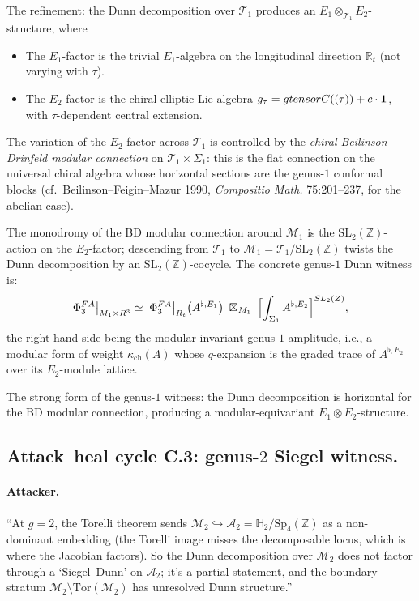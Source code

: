 \documentclass[11pt]{article}
\newcommand{\Eone}{E_{1}}
\newcommand{\Etwo}{E_{2}}
\newcommand{\PhiFA}{\Phi^{\mathrm{FA}}}
\newcommand{\R}{\mathbb{R}}
\newcommand{\C}{\mathbb{C}}
\newcommand{\Z}{\mathbb{Z}}
\newcommand{\cA}{\mathcal{A}}
\newcommand{\cM}{\mathcal{M}}
\newcommand{\cT}{\mathcal{T}}
\newcommand{\frakg}{\mathfrak{g}}
\newcommand{\into}{\hookrightarrow}
\begin{document}
The refinement: the Dunn decomposition over $\cT_1$ produces an
$\Eone \otimes_{\cT_1} \Etwo$-structure, where
\begin{itemize}
\item The $\Eone$-factor is the trivial $\Eone$-algebra on the
  longitudinal direction $\R_t$ (not varying with $\tau$).
\item The $\Etwo$-factor is the chiral elliptic Lie algebra
  $\hat\frakg_\tau = \frakg \otimes \C((\tau)) + c\cdot \mathbf 1$, with
  $\tau$-dependent central extension.
\end{itemize}
The variation of the $\Etwo$-factor across $\cT_1$ is controlled by
the \emph{chiral Beilinson--Drinfeld modular connection} on
$\cT_1 \times \Sigma_1$: this is the flat connection on the
universal chiral algebra whose horizontal sections are the genus-$1$
conformal blocks (cf.\ Beilinson--Feigin--Mazur 1990, \emph{Compositio
Math.} 75:201--237, for the abelian case).

The monodromy of the BD modular connection around $\cM_1$ is the
$\mathrm{SL}_2(\Z)$-action on the $\Etwo$-factor; descending from
$\cT_1$ to $\cM_1 = \cT_1 / \mathrm{SL}_2(\Z)$ twists the Dunn
decomposition by an $\mathrm{SL}_2(\Z)$-cocycle. The concrete genus-$1$
Dunn witness is:
\[
  \PhiFA_3\bigl|_{\overline{\cM}_1 \times \R^3}
  \;\simeq\;
  \PhiFA_3\bigl|_{\R_t}\bigl(A^{\flat, \Eone}\bigr)
  \;\boxtimes_{\overline{\cM}_1}\;
  \Bigl[\int_{\Sigma_1} A^{\flat, \Etwo}\Bigr]^{\mathrm{SL}_2(\Z)},
\]
the right-hand side being the modular-invariant genus-$1$ amplitude,
i.e., a modular form of weight $\kappa_{\mathrm{ch}}(A)$ whose
$q$-expansion is the graded trace of $A^{\flat, \Etwo}$ over its
$\Etwo$-module lattice.

The strong form of the genus-$1$ witness: the Dunn decomposition is
horizontal for the BD modular connection, producing a
modular-equivariant $\Eone \otimes \Etwo$-structure.

\subsection{Attack--heal cycle C.3: genus-$2$ Siegel witness.}

\paragraph{Attacker.}
``At $g = 2$, the Torelli theorem sends $\cM_2 \into \cA_2 = \mathbb H_2
/ \mathrm{Sp}_4(\Z)$ as a non-dominant embedding (the Torelli image
misses the decomposable locus, which is where the Jacobian factors).
So the Dunn decomposition over $\cM_2$ does not factor through a
`Siegel--Dunn' on $\cA_2$; it's a partial statement, and the boundary
stratum $\cM_2 \setminus \mathrm{Tor}(\cM_2)$ has unresolved Dunn
structure.''
\end{document}
